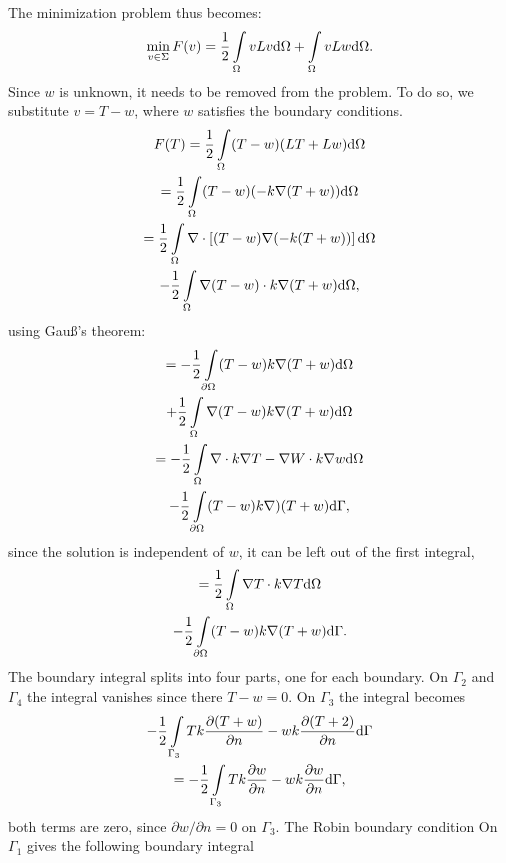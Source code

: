 The minimization problem thus becomes:
\begin{equation}
    \min_{v\in\Sigma} F(v)=\frac{1}{2}\int\displaylimits_{\Omega}vLv \mathrm{d}\Omega + \int\displaylimits_{\Omega}vLw \mathrm{d}\Omega.
\end{equation} Since $w$ is unknown, it needs to be removed from the problem. To do so, we substitute $v=T-w$, where $w$ satisfies the boundary conditions.
\begin{gather*}
    F(T) = \frac{1}{2}\int\displaylimits_\Omega(T-w)(LT+Lw) \mathrm{d}\Omega\\
    = \frac{1}{2}\int\displaylimits_{\Omega}(T-w)(-k\nabla (T+w)) \mathrm{d}\Omega\\
    = \frac{1}{2}\int\displaylimits_{\Omega}\nabla\cdot\left[(T-w)\nabla(-k(T+w))\right] \mathrm{d}\Omega\\
    - \frac{1}{2}\int\displaylimits_{\Omega}\nabla(T-w)\cdot k\nabla(T+w) \mathrm{d}\Omega,
\end{gather*}using Gau\ss's theorem:
\begin{gather*}
    = -\frac{1}{2}\int\displaylimits_{\partial\Omega}(T-w)k\nabla(T+w) \mathrm{d}\Omega\\
    + \frac{1}{2}\int\displaylimits_{\Omega}\nabla(T-w)k\nabla(T+w) \mathrm{d}\Omega\\
    = -\frac{1}{2}\int\displaylimits_{\Omega}\nabla\cdot k\nabla T - \nabla W\cdot k\nabla w \mathrm{d}\Omega\\
    -\frac{1}{2}\int\displaylimits_{\partial\Omega}(T-w)k\nabla)(T+w)\mathrm{d}\Gamma,
\end{gather*}since the solution is independent of $w$, it can be left out of the first integral,
\begin{gather*}
    = \frac{1}{2}\int\displaylimits_{\Omega}\nabla T\cdot k\nabla T \mathrm{d}\Omega \\
    -\frac{1}{2}\int\displaylimits_{\partial\Omega}(T-w)k\nabla (T+w)\mathrm{d}\Gamma.
\end{gather*} The boundary integral splits into four parts, one for each boundary. On $\Gamma_2$ and $\Gamma_4$ the integral vanishes since there $T-w=0$. On $\Gamma_3$ the integral becomes
\begin{gather*}
    -\frac{1}{2}\int\displaylimits_{\Gamma_3} T k \frac{\partial(T+w)}{\partial n} - wk\frac{\partial (T+2)}{\partial n}\mathrm{d}\Gamma\\
    = -\frac{1}{2}\int\displaylimits_{\Gamma_3} T k \frac{\partial w}{\partial n} - w k \frac{\partial w}{\partial n} \mathrm{d}\Gamma,
\end{gather*} both terms are zero, since $\partial w/\partial n = 0$ on $\Gamma_3$. The Robin boundary condition On $\Gamma_1$ gives the following boundary integral 
